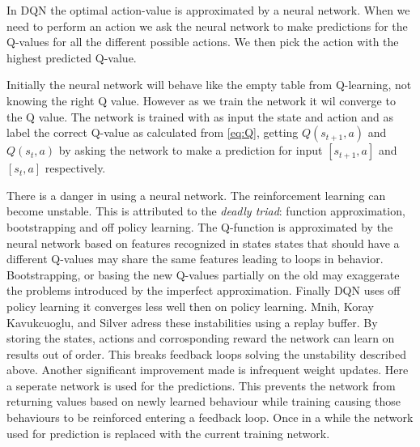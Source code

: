 In DQN the optimal action-value is approximated by a neural network. When we need to perform an action we ask the neural network to make predictions for the Q-values for all the different possible actions. We then pick the action with the highest predicted Q-value. 
 
Initially the neural network will behave like the empty table from Q-learning, not knowing the right Q value. However as we train the network it wil converge to the Q value. The network is trained with as input the state and action and as label the correct Q-value as calculated from \autoref{eq:Q}, getting $Q\left(s_{t+1}, a\right)$ and $Q\left(s_{t}, a\right)$ by asking the network to make a prediction for input $[s_{t+1}, a]$ and $[s_{t}, a]$ respectively. 

There is a danger in using a neural network. The reinforcement learning can become unstable\cite{triad}. This is attributed to the \textit{deadly triad}: function approximation, bootstrapping and off policy learning. The Q-function is approximated by the neural network based on features recognized in states states that should have a different Q-values may share the same features leading to loops in behavior. Bootstrapping, or basing the new Q-values partially on the old may exaggerate the problems introduced by the imperfect approximation. Finally DQN uses off policy learning it converges less well then on policy learning.
\label{sec:infrequent_weight_updates}
Mnih, Koray Kavukcuoglu, and Silver\cite{DQN} adress these instabilities using a replay buffer. By storing the states, actions and corrosponding reward the network can learn on results out of order. This breaks feedback loops solving the unstability described above. Another significant improvement made is infrequent weight updates. Here a seperate network is used for the predictions. This prevents the network from returning values based on newly learned behaviour while training causing those behaviours to be reinforced entering a feedback loop. Once in a while the network used for prediction is replaced with the current training network.
